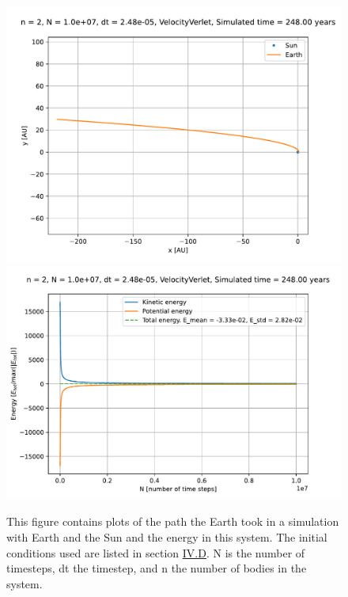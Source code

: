 \documentclass[reprint,english,notitlepage]{revtex4-1}  %
\begin{document}
\begin{figure}[H]
\includegraphics[width=\columnwidth]{../data/figures/escapevelocity/se_esc_exact_orbit2D.pdf}
\includegraphics[width=\columnwidth]{../data/figures/escapevelocity/se_esc_exact_energy.pdf}
\caption{This figure contains plots of the path the Earth took in a simulation with Earth and the Sun and the energy in this system. The initial conditions used are listed in section \hyperref[sec:IV:d]{IV.D}. N is the number of timesteps, dt the timestep, and n the number of bodies in the system.}
\label{fig:escvel_exact}
\end{figure}
\end{document}
